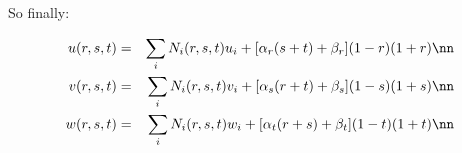 So finally:

\begin{eqnarray}
u(r,s,t)&=&\sum_i N_i(r,s,t) u_i + [\alpha_r (s+t) +\beta_r](1-r)(1+r) \nn\\
v(r,s,t)&=&\sum_i N_i(r,s,t) v_i + [\alpha_s (r+t) +\beta_s](1-s)(1+s) \nn\\
w(r,s,t)&=&\sum_i N_i(r,s,t) w_i + [\alpha_t (r+s) +\beta_t](1-t)(1+t) \nn
\end{eqnarray}










